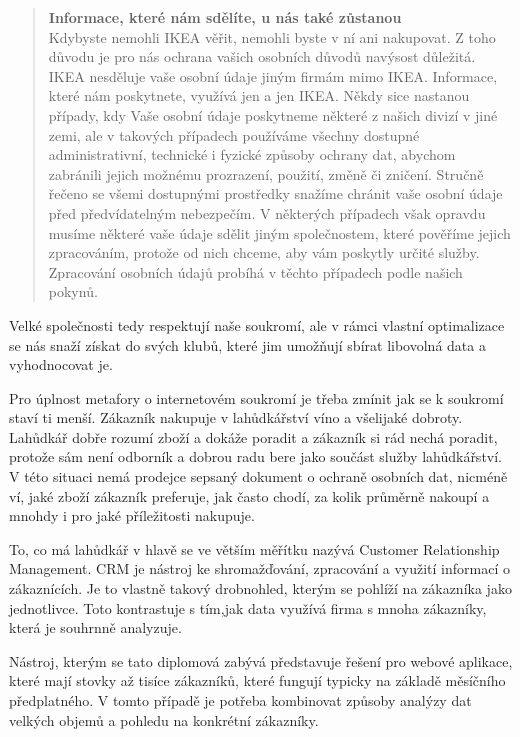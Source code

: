 \documentclass[bc,male,java,dept456]{diploma}						%
\begin{document}
\begin{quote}
{\bf Informace, které nám sdělíte, u nás také zůstanou}\\
Kdybyste nemohli IKEA věřit, nemohli byste v ní ani nakupovat. Z toho dů\-vo\-du je pro nás ochrana vašich osobních důvodů navýsost důležitá. IKEA nesděluje vaše osobní údaje jiným firmám mimo IKEA. Informace, které nám poskytnete, využívá jen a jen IKEA. Někdy sice nastanou případy, kdy Vaše osobní údaje poskytneme některé z našich divizí v jiné zemi, ale v takových případech používáme všechny dostupné administrativní, technické i fyzické způsoby ochrany dat, abychom zabránili jejich možnému prozrazení, použití, změně či zničení. Stručně řečeno se všemi dostupnými prostředky snažíme chránit vaše osobní údaje před předvídatelným nebezpečím. V některých pří\-pa\-dech však opravdu musíme některé vaše údaje sdělit jiným společnostem, které pověříme jejich zpracováním, protože od nich chceme, aby vám poskytly určité služby. Zpracování osobních údajů probíhá v těchto případech podle našich pokynů. 
\end{quote}

Velké společnosti tedy respektují naše soukromí, ale v rámci vlastní optimalizace se nás snaží získat do svých klubů, které jim umožňují sbírat libovolná data a vyhodnocovat je.

Pro úplnost metafory o internetovém soukromí je třeba zmínit jak se k soukromí staví ti menší. Zákazník nakupuje v lahůdkářství víno a všelijaké dobroty. Lahůdkář dobře rozumí zboží a dokáže poradit a zákazník si rád nechá poradit,  protože sám není odborník a dobrou radu bere jako součást služby lahůdkářství. V této situaci nemá prodejce sepsaný dokument o ochraně osobních dat, nicméně ví, jaké zboží zákazník preferuje, jak často chodí, za kolik průměrně nakoupí a mnohdy i pro jaké příležitosti nakupuje.

To, co má lahůdkář v hlavě se ve větším měřítku nazývá Customer Relationship Management. CRM je nástroj ke shromažďování, zpracování a využití informací o zákaznících. Je to vlastně takový drobnohled, kterým se pohlíží na zákazníka jako jednotlivce. Toto kontrastuje s tím,jak data využívá firma s mnoha zákazníky, která je souhrnně analyzuje.

\bigskip

Nástroj, kterým se tato diplomová zabývá představuje řešení pro webové aplikace, které mají stovky až tisíce zákazníků, které fungují typicky na základě měsíčního před\-plat\-ného. V tomto případě je potřeba kombinovat způsoby analýzy dat velkých objemů a pohledu na konkrétní zákazníky. 
\end{document}
